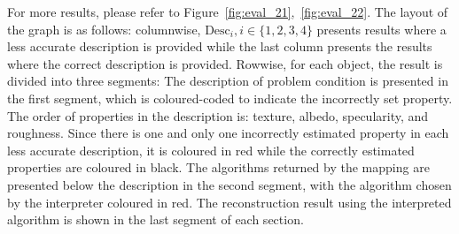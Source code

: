 For more results, please refer to Figure~\ref{fig:eval_21},~\ref{fig:eval_22}. The layout of the graph is as follows: columnwise, $\text{Desc}_i, i\in\{1, 2, 3, 4\}$ presents results where a less accurate description is provided while the last column presents the results where the correct description is provided. Rowwise, for each object, the result is divided into three segments: The description of problem condition is presented in the first segment, which is coloured-coded to indicate the incorrectly set property. The order of properties in the description is: texture, albedo, specularity, and roughness. Since there is one and only one incorrectly estimated property in each less accurate description, it is coloured in red while the correctly estimated properties are coloured in black. The algorithms returned by the mapping are presented below the description in the second segment, with the algorithm chosen by the interpreter coloured in red. The reconstruction result using the interpreted algorithm is shown in the last segment of each section.
